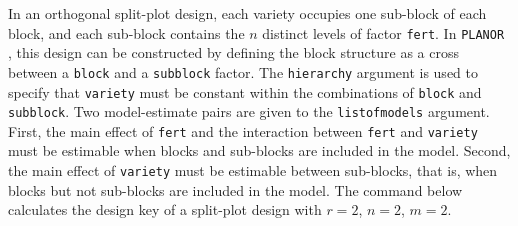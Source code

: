 \documentclass[a4paper]{article}
\newcommand{\PLANOR}{\texttt{PLANOR }}
\begin{document}
In an orthogonal split-plot design, each variety occupies one
sub-block of each block, and each sub-block contains the $n$ distinct
levels of factor \texttt{fert}. In \PLANOR, this design can be
constructed by defining the block structure as a cross between a
\texttt{block} and a \texttt{subblock} factor. The \texttt{hierarchy}
argument is used to specify that \texttt{variety} must be constant
within the combinations of \texttt{block} and \texttt{subblock}. Two
model-estimate pairs are given to the \texttt{listofmodels}
argument. First, the main effect of \texttt{fert} and the interaction
between \texttt{fert} and \texttt{variety} must be estimable when
blocks and sub-blocks are included in the model. Second, the main
effect of \texttt{variety} must be estimable between sub-blocks, that
is, when blocks but not sub-blocks are included in the model. The
command below calculates the design key of a split-plot design with
$r=2$, $n=2$, $m=2$.
\end{document}
